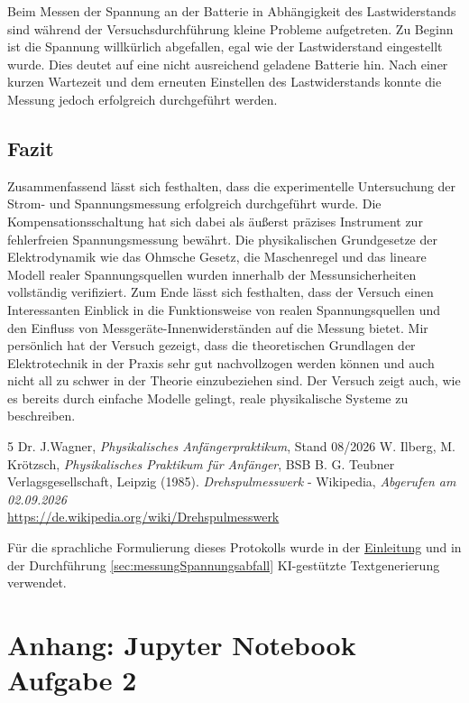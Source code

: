 \documentclass[12pt,a4paper,titlepage]{scrartcl}
\numberwithin{equation}{section}
\numberwithin{table}{section}
\numberwithin{figure}{section}
\begin{document}
Beim Messen der Spannung an der Batterie in Abhängigkeit des Lastwiderstands sind während der Versuchsdurchführung kleine Probleme aufgetreten.
Zu Beginn ist die Spannung willkürlich abgefallen, egal wie der Lastwiderstand eingestellt wurde. Dies deutet auf eine nicht ausreichend geladene Batterie hin.
Nach einer kurzen Wartezeit und dem erneuten Einstellen des Lastwiderstands konnte die Messung jedoch erfolgreich durchgeführt werden. 

\subsection{Fazit}
Zusammenfassend lässt sich festhalten, dass die experimentelle Untersuchung der Strom- und Spannungsmessung erfolgreich durchgeführt wurde.
Die Kompensationsschaltung hat sich dabei als äußerst präzises Instrument zur fehlerfreien Spannungsmessung bewährt. Die physikalischen Grundgesetze der Elektrodynamik wie
das Ohmsche Gesetz, die Maschenregel und das lineare Modell realer Spannungsquellen wurden innerhalb der Messunsicherheiten vollständig verifiziert.
Zum Ende lässt sich festhalten, dass der Versuch einen Interessanten Einblick in die Funktionsweise von realen Spannungsquellen und den
Einfluss von Messgeräte-Innenwiderständen auf die Messung bietet. 
Mir persönlich hat der Versuch gezeigt, dass die theoretischen Grundlagen der Elektrotechnik in der Praxis sehr gut nachvollzogen werden können
und auch nicht all zu schwer in der Theorie einzubeziehen sind.
Der Versuch zeigt auch, wie es bereits durch einfache Modelle gelingt, reale physikalische Systeme zu beschreiben.

\clearpage

\listoffigures


\listoftables

\begin{thebibliography}{5}
     Dr. J.Wagner, \emph{Physikalisches Anfängerpraktikum}, Stand 08/2026
     W. Ilberg, M. Krötzsch, \emph{Physikalisches Praktikum für Anfänger}, BSB B. G. Teubner Verlagsgesellschaft, Leipzig (1985).
     \emph{Drehspulmesswerk} - Wikipedia, \textit{Abgerufen am 02.09.2026}\\
    \url{https://de.wikipedia.org/wiki/Drehspulmesswerk} 
\end{thebibliography}



\begin{tcolorbox}[colback=gray!5,colframe=gray!60,boxrule=0.8pt,arc=0.01mm,title=KI-Hinweis]
    Für die sprachliche Formulierung dieses Protokolls wurde in der {\hyperref[Einleitung]{Einleitung}} und 
    in der Durchführung \ref{sec:messungSpannungsabfall} KI-gestützte Textgenerierung verwendet. 
\end{tcolorbox}

\clearpage

\appendix
\section{Anhang: Jupyter Notebook Aufgabe 2}

\end{document}
